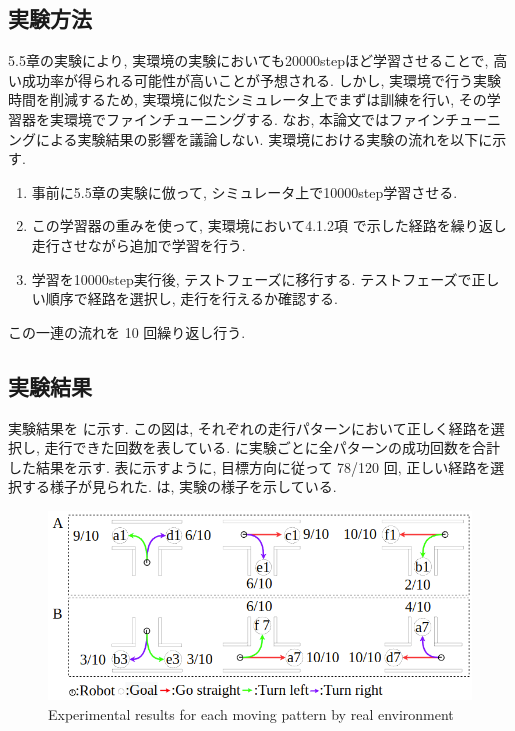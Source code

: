 \subsection{実験方法}
5.5章の実験により, 実環境の実験においても20000stepほど学習させることで, 高い成功率が得られる可能性が高いことが予想される. しかし, 実環境で行う実験時間を削減するため, 実環境に似たシミュレータ上でまずは訓練を行い, その学習器を実環境でファインチューニングする. なお, 本論文ではファインチューニングによる実験結果の影響を議論しない. 実環境における実験の流れを以下に示す.
\begin{enumerate}
  \item 事前に5.5章の実験に倣って, シミュレータ上で10000step学習させる. 
  \item この学習器の重みを使って, 実環境において4.1.2項 で示した経路を繰り返し走行させながら追加で学習を行う.
  \item 学習を10000step実行後, テストフェーズに移行する. テストフェーズで正しい順序で経路を選択し, 走行を行えるか確認する.
\end{enumerate}
この一連の流れを 10 回繰り返し行う.

\subsection{実験結果}
実験結果を  に示す. この図は, それぞれの走行パターンにおいて正しく経路を選択し, 走行できた回数を表している.  に実験ごとに全パターンの成功回数を合計した結果を示す. 表に示すように, 目標方向に従って 78/120 回, 正しい経路を選択する様子が見られた. は, 実験の様子を示している.

\begin{figure}[hbtp]
  \centering
 \includegraphics[keepaspectratio, scale=0.48]
      {images/real_result.png}
 \caption{Experimental results for each moving pattern by real environment}
 \label{Fig:real_result}
\end{figure}

